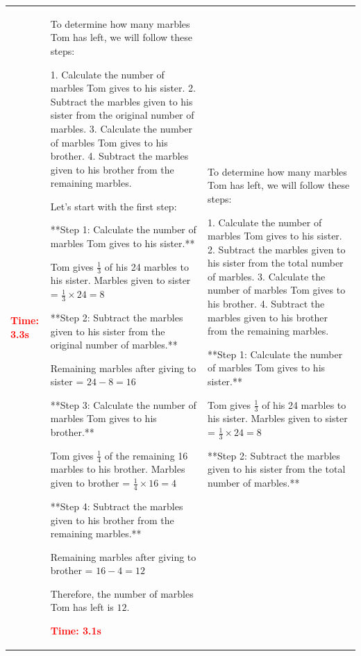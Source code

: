 \documentclass{article} %
\theoremstyle{definition}
\theoremstyle{remark}
\begin{document}
\begin{table}[h]
\begin{tabular}{|>{\columncolor{lightblue}}p{5cm}|>{\columncolor{lightgreen}}p{5cm}|>{\columncolor{lightpink}}p{5cm}|}
\vspace{0.2cm}
\textcolor{red}{\textbf{Time: 3.3s}}
&
\footnotesize
To determine how many marbles Tom has left, we will follow these steps:

1. Calculate the number of marbles Tom gives to his sister.
2. Subtract the marbles given to his sister from the original number of marbles.
3. Calculate the number of marbles Tom gives to his brother.
4. Subtract the marbles given to his brother from the remaining marbles.

Let's start with the first step:

**Step 1: Calculate the number of marbles Tom gives to his sister.**

Tom gives $\frac{1}{3}$ of his 24 marbles to his sister.
Marbles given to sister = $\frac{1}{3} \times 24 = 8$

**Step 2: Subtract the marbles given to his sister from the original number of marbles.**

Remaining marbles after giving to sister = $24 - 8 = 16$

**Step 3: Calculate the number of marbles Tom gives to his brother.**

Tom gives $\frac{1}{4}$ of the remaining 16 marbles to his brother.
Marbles given to brother = $\frac{1}{4} \times 16 = 4$

**Step 4: Subtract the marbles given to his brother from the remaining marbles.**

Remaining marbles after giving to brother = $16 - 4 = 12$

Therefore, the number of marbles Tom has left is $\boxed{12}$.

\vspace{0.2cm}
\textcolor{red}{\textbf{Time: 3.1s}}
&
\footnotesize
To determine how many marbles Tom has left, we will follow these steps:

1. Calculate the number of marbles Tom gives to his sister.
2. Subtract the marbles given to his sister from the total number of marbles.
3. Calculate the number of marbles Tom gives to his brother.
4. Subtract the marbles given to his brother from the remaining marbles.

**Step 1: Calculate the number of marbles Tom gives to his sister.**

Tom gives $\frac{1}{3}$ of his 24 marbles to his sister.
Marbles given to sister = $\frac{1}{3} \times 24 = 8$

**Step 2: Subtract the marbles given to his sister from the total number of marbles.**


\end{tabular}
\end{table}
\end{document}
